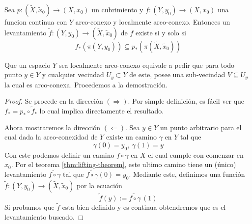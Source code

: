 \begin{teorema}\label{thm:lifting-theorem-general}
  Sea \(p : (\tilde X , \tilde x_0) \to ( X , x _0 )\) un cubrimiento y
  \(f : (Y , y_0) \to ( X , x _0 )\) una funcion continua con \(Y\)
  arco-conexo y localmente arco-conexo. Entonces un levantamiento
  \(\tilde f : (Y , y_0) \to (\tilde X, \tilde x _0)\) de \(f\) existe
  si y solo si
  \[ f_* \left( \pi (Y, y_0) \right) \subseteq p_* \left( \pi ( \tilde X
      , \tilde x_0 ) \right) \]
\end{teorema}
Que un espacio \(Y\) sea localmente arco-conexo equivale a pedir que
para todo punto \(y \in Y\) y cualquier vecindad \(U_y \subset Y\) de
este, posee una sub-vecindad \(V \subseteq U_y\) la cual es arco-conexa.
Procedemos a la demostración.
\begin{proof}
  Se procede en la dirección \((\Rightarrow)\). Por simple definición,
  es fácil ver que \(f_* = p_* \circ \tilde f _*\) lo cual implica
  directamente el resultado.

  Ahora mostraremos la dirección \((\Leftarrow)\). Sea \(y \in Y\) un
  punto arbitrario para el cual dada la arco-conexidad de \(Y\) existe
  un camino \(\gamma\) en \(Y\) tal que
  \[\gamma (0) = y_0,\ \gamma (1) = y\]
  Con este podemos definir un camino \(f \circ \gamma\) en \(X\) el cual
  cumple con comenzar en \(x_0\). Por el teorema
  \ref{thm:lifting-theorem}, este ultimo camino tiene un (único)
  levantamiento \(\widetilde {f \circ \gamma}\) tal que \(\widetilde{f
  \circ \gamma} (0) = y_0 \). Mediante este, definimos una función
  \(\tilde f : (Y, y_0) \to (\tilde X , \tilde x_0)\) por la ecuación
  \begin{equation} \label{def:f-tilda}
    \tilde f (y) := \widetilde{f \circ \gamma} \, (1)
  \end{equation}
  Si probamos que \(\tilde f\) esta bien definido y es continua
  obtendremos que es el levantamiento buscado.


\end{proof}
